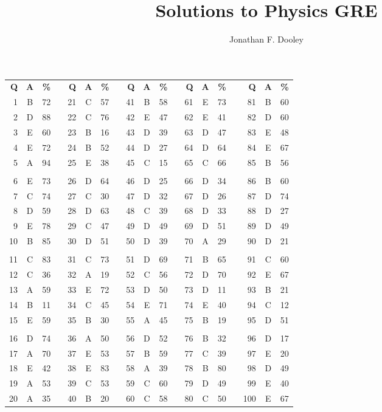 \documentclass[12pt]{article}
\title{Solutions to \Year Physics GRE}
\author{Jonathan F. Dooley}
\newcommand{\Year}{2008}
\newcommand{\Ident}{GR0877}
\newcommand{\Version}{2.0}
\begin{document}
\TitlePage{\Year}{\Ident}{\Version}

\begin{table}
\centering
\begin{tabular}{rcrc rcrc rcrc rcrc rcc}
\textbf{Q} & \textbf{A} & \textbf{\%} &&
\textbf{Q} & \textbf{A} & \textbf{\%} &&
\textbf{Q} & \textbf{A} & \textbf{\%} &&
\textbf{Q} & \textbf{A} & \textbf{\%} &&
\textbf{Q} & \textbf{A} & \textbf{\%} \\
1  & B & 72 && 21 & C & 57 && 41 & B & 58 && 61 & E & 73 && 81  & B & 60  \\
2  & D & 88 && 22 & C & 76 && 42 & E & 47 && 62 & E & 41 && 82  & D & 60  \\
3  & E & 60 && 23 & B & 16 && 43 & D & 39 && 63 & D & 47 && 83  & E & 48  \\
4  & E & 72 && 24 & B & 52 && 44 & D & 27 && 64 & D & 64 && 84  & E & 67  \\
5  & A & 94 && 25 & E & 38 && 45 & C & 15 && 65 & C & 66 && 85  & B & 56  \\
   &   &    &&    &   &    &&    &   &    &&    &   &    &&     &   &     \\
6  & E & 73 && 26 & D & 64 && 46 & D & 25 && 66 & D & 34 && 86  & B & 60  \\
7  & C & 74 && 27 & C & 30 && 47 & D & 32 && 67 & D & 26 && 87  & D & 74  \\
8  & D & 59 && 28 & D & 63 && 48 & C & 39 && 68 & D & 33 && 88  & D & 27  \\
9  & E & 78 && 29 & C & 47 && 49 & D & 49 && 69 & D & 51 && 89  & D & 49  \\
10 & B & 85 && 30 & D & 51 && 50 & D & 39 && 70 & A & 29 && 90  & D & 21  \\
   &   &    &&    &   &    &&    &   &    &&    &   &    &&     &   &     \\
11 & C & 83 && 31 & C & 73 && 51 & D & 69 && 71 & B & 65 && 91  & C & 60  \\
12 & C & 36 && 32 & A & 19 && 52 & C & 56 && 72 & D & 70 && 92  & E & 67  \\
13 & A & 59 && 33 & E & 72 && 53 & D & 50 && 73 & D & 11 && 93  & B & 21  \\
14 & B & 11 && 34 & C & 45 && 54 & E & 71 && 74 & E & 40 && 94  & C & 12  \\
15 & E & 59 && 35 & B & 30 && 55 & A & 45 && 75 & B & 19 && 95  & D & 51  \\
   &   &    &&    &   &    &&    &   &    &&    &   &    &&     &   &     \\
16 & D & 74 && 36 & A & 50 && 56 & D & 52 && 76 & B & 32 && 96  & D & 17  \\
17 & A & 70 && 37 & E & 53 && 57 & B & 59 && 77 & C & 39 && 97  & E & 20  \\
18 & E & 42 && 38 & E & 83 && 58 & A & 39 && 78 & B & 80 && 98  & D & 49  \\
19 & A & 53 && 39 & C & 53 && 59 & C & 60 && 79 & D & 49 && 99  & E & 40  \\
20 & A & 35 && 40 & B & 20 && 60 & C & 58 && 80 & C & 50 && 100 & E & 67
\end{tabular}
\end{table}
\end{document}
